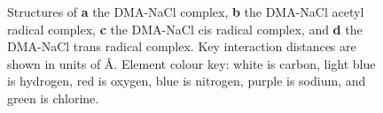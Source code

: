 \begin{figure}[!htbp]
	\centering


	\caption[Structures of the DMA-NaCl complex and associated radical complexes.]{Structures of \textbf{a} the DMA-NaCl complex, \textbf{b} the DMA-NaCl acetyl radical complex, \textbf{c} the DMA-NaCl cis radical complex, and \textbf{d} the DMA-NaCl trans radical complex. Key interaction distances are shown in units of \AA. Element colour key: white is carbon, light blue is hydrogen, red is oxygen, blue is nitrogen, purple is sodium, and green is chlorine.}
	\label{fig:dma-na-cl}
\end{figure}

